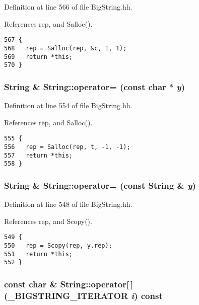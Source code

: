 Definition at line 566 of file Big\-String.hh.

References rep, and Salloc().



\footnotesize\begin{verbatim}567 {
568   rep = Salloc(rep, &c, 1, 1);
569   return *this;
570 }
\end{verbatim}\normalsize 
{}
\subsubsection{\setlength{\rightskip}{0pt plus 5cm}String \& String::operator= (const char $\ast$ {\em y})\hspace{0.3cm}{\tt  [inline]}}\label{classString_a11}




Definition at line 554 of file Big\-String.hh.

References rep, and Salloc().



\footnotesize\begin{verbatim}555 {
556   rep = Salloc(rep, t, -1, -1);
557   return *this;
558 }
\end{verbatim}\normalsize 
{}
\subsubsection{\setlength{\rightskip}{0pt plus 5cm}String \& String::operator= (const String \& {\em y})\hspace{0.3cm}{\tt  [inline]}}\label{classString_a10}




Definition at line 548 of file Big\-String.hh.

References rep, and Scopy().



\footnotesize\begin{verbatim}549 { 
550   rep = Scopy(rep, y.rep);
551   return *this;
552 }
\end{verbatim}\normalsize 
{}
\subsubsection{\setlength{\rightskip}{0pt plus 5cm}const char \& String::operator[$\,$] ({\bf \_\-BIGSTRING\_\-ITERATOR} {\em i}) const\hspace{0.3cm}{\tt  [inline]}}\label{classString_a99}




